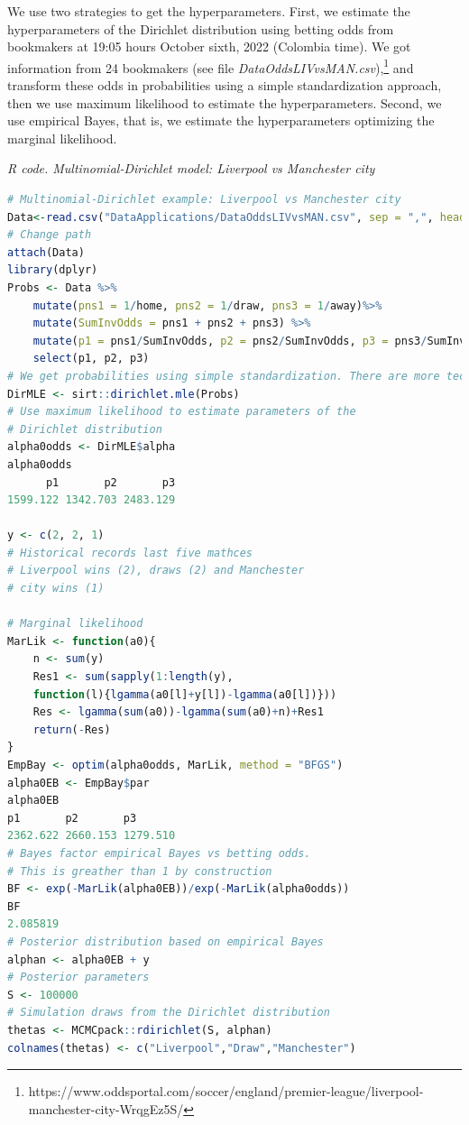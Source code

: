 \begin{enumerate}
We use two strategies to get the hyperparameters. First, we estimate the hyperparameters of the Dirichlet distribution using betting odds from bookmakers at 19:05 hours October sixth, 2022 (Colombia time). We got information from 24 bookmakers (see file \textit{DataOddsLIVvsMAN.csv}),\footnote{https://www.oddsportal.com/soccer/england/premier-league/liverpool-manchester-city-WrqgEz5S/} and transform these odds in probabilities using a simple standardization approach, then we use maximum likelihood to estimate the hyperparameters. Second, we use empirical Bayes, that is, we estimate the hyperparameters optimizing the marginal likelihood.   


\begin{tcolorbox}[enhanced,width=4.67in,center upper,
	fontupper=\large\bfseries,drop shadow southwest,sharp corners]
	\textit{R code. Multinomial-Dirichlet model: Liverpool vs Manchester city}
\begin{VF}
\begin{lstlisting}[language=R]
# Multinomial-Dirichlet example: Liverpool vs Manchester city
Data<-read.csv("DataApplications/DataOddsLIVvsMAN.csv", sep = ",", header = TRUE)
# Change path
attach(Data)
library(dplyr)
Probs <- Data %>%
	mutate(pns1 = 1/home, pns2 = 1/draw, pns3 = 1/away)%>% 
	mutate(SumInvOdds = pns1 + pns2 + pns3) %>% 
	mutate(p1 = pns1/SumInvOdds, p2 = pns2/SumInvOdds, p3 = pns3/SumInvOdds) %>% 
	select(p1, p2, p3)
# We get probabilities using simple standardization. There are more technical approaches to do this. See for instance Shin (1993) and Strumbelj (2014). 
DirMLE <- sirt::dirichlet.mle(Probs)
# Use maximum likelihood to estimate parameters of the
# Dirichlet distribution
alpha0odds <- DirMLE$alpha
alpha0odds
      p1       p2       p3 
1599.122 1342.703 2483.129 

y <- c(2, 2, 1) 
# Historical records last five mathces
# Liverpool wins (2), draws (2) and Manchester
# city wins (1)

# Marginal likelihood
MarLik <- function(a0){
	n <- sum(y)
	Res1 <- sum(sapply(1:length(y), 
	function(l){lgamma(a0[l]+y[l])-lgamma(a0[l])}))
	Res <- lgamma(sum(a0))-lgamma(sum(a0)+n)+Res1
	return(-Res)
}
EmpBay <- optim(alpha0odds, MarLik, method = "BFGS")
alpha0EB <- EmpBay$par
alpha0EB
p1       p2       p3 
2362.622 2660.153 1279.510 
# Bayes factor empirical Bayes vs betting odds. 
# This is greather than 1 by construction
BF <- exp(-MarLik(alpha0EB))/exp(-MarLik(alpha0odds))
BF
2.085819
# Posterior distribution based on empirical Bayes
alphan <- alpha0EB + y 
# Posterior parameters 
S <- 100000
# Simulation draws from the Dirichlet distribution 
thetas <- MCMCpack::rdirichlet(S, alphan)
colnames(thetas) <- c("Liverpool","Draw","Manchester")
\end{lstlisting}
\end{VF}
\end{tcolorbox}



\end{enumerate}
